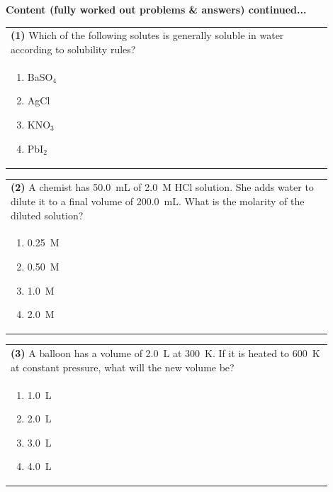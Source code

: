 \documentclass{article}
\begin{document}
{{\noindent
{\large\textbf{Content (fully worked out problems \& answers) continued...}}\\[0.2em]
\vspace{0.2cm}

\vspace{0.2cm}
\noindent\begin{tabular}{|p{0.9\linewidth}|}
\hline
\textbf{(1)} Which of the following solutes is generally soluble in water according to solubility rules?\\[0.2cm]
\begin{minipage}[t]{0.85\linewidth}
\begin{enumerate}[label=\alph*.]
\item BaSO$_4$
\item AgCl
\item KNO$_3$
\item PbI$_2$
\end{enumerate}
\end{minipage}\\[0.2cm]
\hline
\end{tabular}

\noindent\begin{tabular}{|p{0.9\linewidth}|}
\hline
\textbf{(2)} A chemist has 50.0~mL of 2.0~M HCl solution. She adds water to dilute it to a final volume of 200.0~mL. What is the molarity of the diluted solution?\\[0.2cm]
\begin{minipage}[t]{0.85\linewidth}
\begin{enumerate}[label=\alph*.]
\item 0.25~M
\item 0.50~M
\item 1.0~M
\item 2.0~M
\end{enumerate}
\end{minipage}\\[0.2cm]
\hline
\end{tabular}

\noindent\begin{tabular}{|p{0.9\linewidth}|}
\hline
\textbf{(3)} A balloon has a volume of 2.0~L at 300~K. If it is heated to 600~K at constant pressure, what will the new volume be?\\[0.2cm]
\begin{minipage}[t]{0.85\linewidth}
\begin{enumerate}[label=\alph*.]
\item 1.0~L
\item 2.0~L
\item 3.0~L
\item 4.0~L
\end{enumerate}
\end{minipage}\\[0.2cm]
\hline
\end{tabular}

}}
\end{document}

